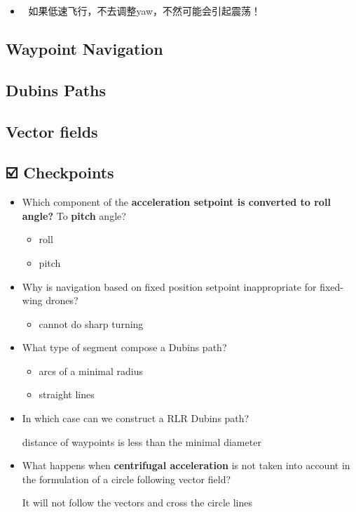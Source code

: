 \documentclass[]{article}
\begin{document}
\begin{itemize}
\item
  🚧 如果低速飞行，不去调整yaw，不然可能会引起震荡！
\end{itemize}

\subsection{Waypoint Navigation}\label{header-n1064}

\subsection{Dubins Paths}\label{header-n1065}

\subsection{Vector fields}\label{header-n1066}

\subsection{☑️ Checkpoints}\label{header-n1067}

\begin{itemize}
\item
  Which component of the \textbf{acceleration setpoint is converted to
  roll angle?} To \textbf{pitch} angle?

  \begin{itemize}
  \item
    roll 
  \item
    pitch
  \end{itemize}
\item
  Why is navigation based on fixed position setpoint inappropriate for
  fixed-wing drones?

  \begin{itemize}
  \item
    cannot do sharp turning
  \end{itemize}
\item
  What type of segment compose a Dubins path?

  \begin{itemize}
  \item
    arcs of a minimal radius
  \item
    straight lines
  \end{itemize}
\item
  In which case can we construct a RLR Dubins path?

  distance of waypoints is less than the minimal diameter 
\item
  What happens when \textbf{centrifugal acceleration} is not taken into
  account in the formulation of a circle following vector field?

  It will not follow the vectors and cross the circle lines
\end{itemize}
\end{document}
